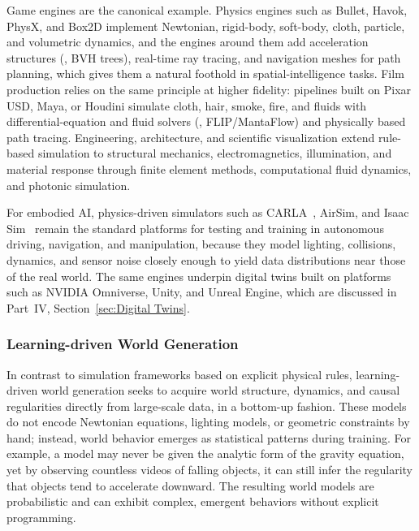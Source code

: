 Game engines are the canonical example. Physics engines such as Bullet, Havok, PhysX, and Box2D implement Newtonian, rigid-body, soft-body, cloth, particle, and volumetric dynamics, and the engines around them add acceleration structures (\eg, BVH trees), real-time ray tracing, and navigation meshes for path planning, which gives them a natural foothold in spatial-intelligence tasks. Film production relies on the same principle at higher fidelity: pipelines built on Pixar USD, Maya, or Houdini simulate cloth, hair, smoke, fire, and fluids with differential-equation and fluid solvers (\eg, FLIP/MantaFlow) and physically based path tracing. Engineering, architecture, and scientific visualization extend rule-based simulation to structural mechanics, electromagnetics, illumination, and material response through finite element methods, computational fluid dynamics, and photonic simulation.

For embodied AI, physics-driven simulators such as CARLA~\cite{dosovitskiy2017carla}, AirSim, and Isaac Sim~\cite{NVIDIA2021Isaac} remain the standard platforms for testing and training in autonomous driving, navigation, and manipulation, because they model lighting, collisions, dynamics, and sensor noise closely enough to yield data distributions near those of the real world. The same engines underpin digital twins built on platforms such as NVIDIA Omniverse, Unity, and Unreal Engine, which are discussed in Part~IV, Section~\ref{sec:Digital Twins}.





\subsubsection{Learning-driven World Generation}

In contrast to simulation frameworks based on explicit physical rules, learning-driven world generation seeks to acquire world structure, dynamics, and causal regularities directly from large-scale data, in a bottom-up fashion.
These models do not encode Newtonian equations, lighting models, or geometric constraints by hand; instead, world behavior emerges as statistical patterns during training.
For example, a model may never be given the analytic form of the gravity equation, yet by observing countless videos of falling objects, it can still infer the regularity that objects tend to accelerate downward.
The resulting world models are probabilistic and can exhibit complex, emergent behaviors without explicit programming.


